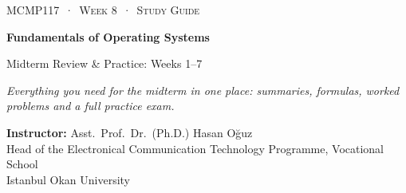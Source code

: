 \documentclass[11pt,a4paper]{article}
\begin{document}
\setlength{\emergencystretch}{3em}
\newcommand{\gantt}[2]{%
\begin{tikzpicture}[x=#1cm,y=1cm]
\foreach \p/\a/\b in {#2} {
  \fill[col\p] (\a,0) rectangle (\b,0.62);
  \draw[white,line width=1.2pt] (\a,0) -- (\a,0.62);
  \node[font=\small\bfseries,text=txt\p] at ({(\a+\b)/2},0.31) {\p};
  \draw[muted] (\a,0) -- (\a,-0.1) node[below,font=\scriptsize,text=muted,inner sep=1.5pt] {\a};
  \draw[muted] (\b,0) -- (\b,-0.1) node[below,font=\scriptsize,text=muted,inner sep=1.5pt] {\b};
}
\end{tikzpicture}}
\newcommand{\gen}[1]{}
\newcommand{\pts}[1]{\textcolor{mintdeep}{\textbf{[#1~pt]}}\enspace}

\thispagestyle{empty}
\begin{tcolorbox}[enhanced,colback=dark,colframe=dark,arc=0pt,boxrule=0pt,
  left=18pt,right=18pt,top=20pt,bottom=20pt,coltext=white]
{\small\color{mint}\textsc{MCMP117 \,·\, Week 8 \,·\, Study Guide}}\par\medskip
{\headfont\fontsize{26}{30}\selectfont\bfseries Fundamentals of Operating Systems}\par\medskip
{\large Midterm Review \& Practice: Weeks 1--7}\par\smallskip
{\small\itshape\color{white!70} Everything you need for the midterm in one place: summaries, formulas, worked problems and a full practice exam.}
\end{tcolorbox}

\vspace{0.4em}
{\small
\textbf{Instructor:} Asst.\ Prof.\ Dr.\ (Ph.D.) Hasan Oğuz\\
Head of the Electronical Communication Technology Programme, Vocational School\\
Istanbul Okan University\par}
\end{document}
